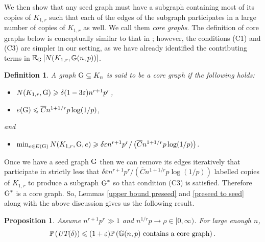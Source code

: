 \documentclass[a4paper,11pt,english,reqno]{amsart}
\numberwithin{equation}{section}
\renewcommand{\leq}{\leqslant}
\renewcommand{\geq}{\geqslant}
\newcommand{\cbar}{\overline{C}}
\newcommand{\E}{\mathbb{E}}
\renewcommand{\P}{\mathbb{P}}
\newcommand{\G}{\mathbb{G}}
\newcommand{\tu}[1]{\textup{#1}}
\newtheorem{proposition}[theorem]{Proposition}
\newtheorem{definition}[theorem]{Definition}
\begin{document}
			We then show that any seed graph must have a subgraph containing most of its copies of $K_{1,r}$ such that each of the edges of the subgraph participates in a large number of copies of $K_{1,r}$ as well. We call them \textit{core graphs}.  The definition of core graphs below is conceptually similar to that in  \cite{HMS}; however, the conditions (C1) and (C3) are simpler in our setting, as we have already identified the contributing terms in $\E_{\tu{G}}\left[N(K_{1,r}, \G(n,p))\right]$.
			\begin{definition}\label{def:c-graph}
				A graph $\tu{G}\subseteq K_n$ is said to be a core graph if the following holds:
				\begin{itemize}
					\item[(C1)]\label{num copies}$N(K_{1,r}, \tu{G})\geq \delta(1-3\varepsilon)n^{r+1}p^{r}$,
					\item[(C2)] \label{max edges}$e(\tu{G})\leq \cbar n^{1+1/r}p \log(1/p)$, 
				\end{itemize}
				and 
				\begin{itemize}
					\item[(C3)] $\min_{e\in E(\tu{G})}N(K_{1,r}, \tu{G},e)\geq \delta \varepsilon n^{r+1}p^{r}/ \left(\cbar n^{1+1/r}p \log(1/p)\right)$.
				\end{itemize}
			\end{definition}
			Once we have a seed graph $\tu{G}$ then we can remove its edges iteratively that participate in strictly less that $\delta\varepsilon n^{r+1}p^{r}/\left(\cbar n^{1+1/r}p \log(1/p)\right)$ labelled copies of $K_{1,r}$ to produce a subgraph $\tu{G}^{*}$ so that condition (C3) is satisfied. %
			Therefore $\tu{G}^{*}$ is a core graph.
			So, Lemmas \ref{upper bound preseed} and \ref{preseed to seed} along with the above discussion gives us the following result.
			\begin{proposition}
				\label{1st reduction}
				Assume $n^{r+1}p^{r}\gg 1$ and $n^{1/r}p\rightarrow \rho \in [0,\infty)$. For large enough $n$,
				\begin{equation*}
					\P\left(\text{\em{UT}}(\delta)\right) \leq (1+\varepsilon)\P\left(\G(n,p)\textup{ contains a core graph}\right).
				\end{equation*}
			\end{proposition}
\end{document}
